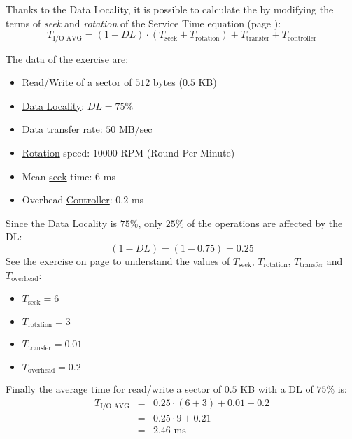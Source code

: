 \highspace
Thanks to the Data Locality, it is possible to calculate the  by modifying the terms of \emph{seek} and \emph{rotation} of the Service Time equation (page \pageref{eq: Service Time}):
\begin{equation}\label{eq: Input Output average time}
    T_{\text{I/O AVG}} = \left(1 - DL\right) \cdot \left(T_{\text{seek}} + T_{\text{rotation}}\right) + T_{\text{transfer}} + T_{\text{controller}}
\end{equation}


\begin{exercisebox}
    The data of the exercise are:
    \begin{itemize}
        \item Read/Write of a sector of $512$ bytes ($0.5$ KB)
        \item \underline{Data Locality}: $DL = 75\%$
        \item Data \underline{transfer} rate: $50$ MB/sec
        \item \underline{Rotation} speed: $10000$ RPM (Round Per Minute)
        \item Mean \underline{seek} time: $6$ ms
        \item Overhead \underline{Controller}: $0.2$ ms
    \end{itemize}
    Since the Data Locality is $75\%$, only $25\%$ of the operations are affected by the DL:
    \begin{equation*}
        \left(1-DL\right) = \left(1 - 0.75\right) = 0.25
    \end{equation*}
    See the exercise on page \pageref{exercise: mean service time of an I/O operation} to understand the values of $T_{\text{seek}}$, $T_{\text{rotation}}$, $T_{\text{transfer}}$ and $T_{\text{overhead}}$:
    \begin{itemize}
        \item $T_{\text{seek}} = 6$
        \item $T_{\text{rotation}} = 3$
        \item $T_{\text{transfer}} = 0.01$
        \item $T_{\text{overhead}} = 0.2$
    \end{itemize}
    Finally the average time for read/write a sector of $0.5$ KB with a DL of $75\%$ is:
    \begin{equation*}
        \begin{array}{rcl}
            T_{\text{I/O AVG}} &=& 0.25 \cdot \left(6 + 3\right) + 0.01 + 0.2 \\ [1em]
            &=& 0.25 \cdot 9 + 0.21 \\ [1em]
            &=& 2.46 \text{ ms}
        \end{array}
    \end{equation*}
\end{exercisebox}

